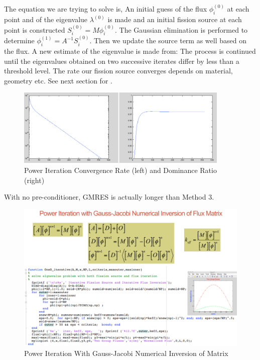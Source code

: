 \documentclass{school-22.211-notes}
\begin{document}
The equation we are trying to solve is,
An initial guess of the flux $\phi_i^{(0)}$ at each point and of the eigenvalue $\lambda^{(0)}$ is made and an initial fission source at each point is constructed $S_i^{(0)} = M \phi_i^{(0)}$. The Gaussian elimination is performed to determine $\phi_i^{(1)} = A^{-1} S_i^{(0)}$. Then we update the source term as well based on the flux. A new estimate of the eigenvalue is made from: 
The process is continued until the eigenvalues obtained on two successive iterates differ by less than a threshold level. The rate our fission source converges depends on material, geometry etc. See next section for . 
\begin{figure}
  \centering
  \includegraphics[width=4in]{images/dfs/power-iteration-convergence.png}
  \caption{Power Iteration Convergence Rate (left) and Dominance Ratio (right)}
\end{figure}

With no pre-conditioner, GMRES is actually longer than Method 3. 


\begin{figure}[ht]
  \centering
  \includegraphics[width=6in]{images/dfs/power-iteration-Gauss-Jacobi.png}
  \caption{Power Iteration With Gauss-Jacobi Numerical Inversion of Matrix}
\end{figure}
\end{document}
